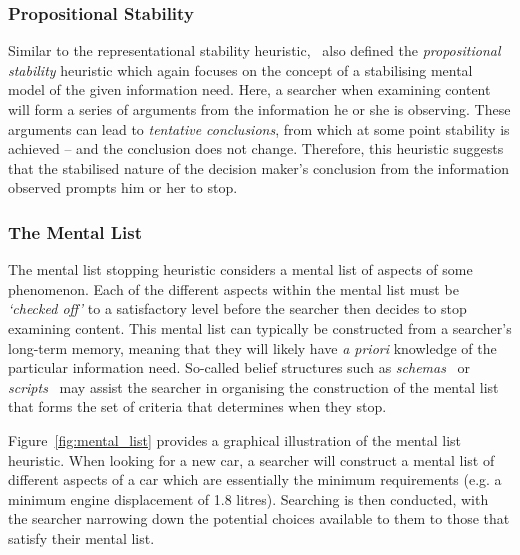 \vspace*{-4mm}
\subsubsection{Propositional Stability}\label{sec:stopping_background:heuristics:propositional}
Similar to the representational stability heuristic,~\cite{nickles1995judgment} also defined the \emph{propositional stability} heuristic which again focuses on the concept of a stabilising mental model of the given information need. Here, a searcher when examining content will form a series of arguments from the information he or she is observing. These arguments can lead to \emph{tentative conclusions}, from which at some point stability is achieved -- and the conclusion does not change. Therefore, this heuristic suggests that the stabilised nature of the decision maker's conclusion from the information observed prompts him or her to stop.

\vspace*{-4mm}
\subsubsection{The Mental List}\label{sec:stopping_background:heuristics:mental}
The mental list stopping heuristic considers a mental list of aspects of some phenomenon. Each of the different aspects within the mental list must be \emph{`checked off'} to a satisfactory level before the searcher then decides to stop examining content. This mental list can typically be constructed from a searcher's long-term memory, meaning that they will likely have \emph{a priori} knowledge of the particular information need. So-called belief structures such as \emph{schemas}~\citep{bartlett1933remembering} or \emph{scripts}~\citep{schank1977scripts} may assist the searcher in organising the construction of the mental list that forms the set of criteria that determines when they stop.

Figure~\ref{fig:mental_list} provides a graphical illustration of the mental list heuristic. When looking for a new car, a searcher will construct a mental list of different aspects of a car which are essentially the minimum requirements (e.g. a minimum engine displacement of 1.8 litres). Searching is then conducted, with the searcher narrowing down the potential choices available to them to those that satisfy their mental list.

